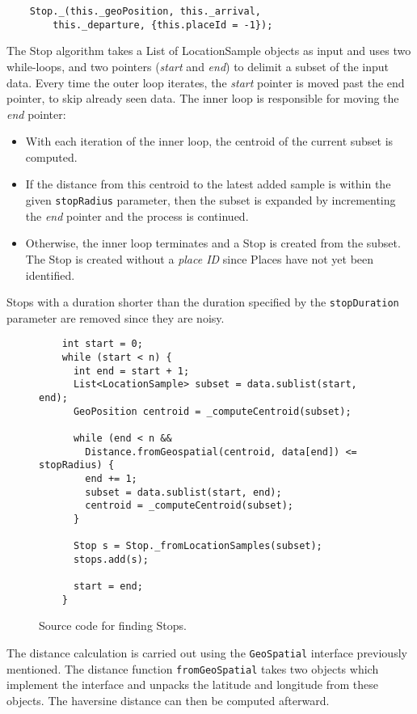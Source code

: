 \begin{verbatim}
    Stop._(this._geoPosition, this._arrival, 
        this._departure, {this.placeId = -1});
\end{verbatim}

The Stop algorithm takes a List of LocationSample objects as input and uses two while-loops, and two pointers (\textit{start} and \textit{end}) to delimit a subset of the input data. Every time the outer loop iterates, the \textit{start} pointer is moved past the end pointer, to skip already seen data. The inner loop is responsible for moving the \textit{end} pointer: \begin{itemize}
    \item With each iteration of the inner loop, the centroid of the current subset is computed.
    \item If the distance from this centroid to the latest added sample is within the given \verb|stopRadius| parameter, then the subset is expanded by incrementing the \textit{end} pointer and the process is continued.
    \item Otherwise, the inner loop terminates and a Stop is created from the subset. The Stop is created without a \textit{place ID} since Places have not yet been identified.
\end{itemize}

Stops with a duration shorter than the duration specified by the \verb|stopDuration| parameter are removed since they are noisy. 

\begin{figure}[h]
    \centering
    \begin{verbatim}
    int start = 0;
    while (start < n) {
      int end = start + 1;
      List<LocationSample> subset = data.sublist(start, end);
      GeoPosition centroid = _computeCentroid(subset);
        
      while (end < n && 
        Distance.fromGeospatial(centroid, data[end]) <= stopRadius) {
        end += 1;
        subset = data.sublist(start, end);
        centroid = _computeCentroid(subset);
      }
    
      Stop s = Stop._fromLocationSamples(subset);
      stops.add(s);
    
      start = end;
    }
\end{verbatim}
    \caption{Source code for finding Stops.}
    \label{fig:source-code-stops}
\end{figure}

The distance calculation is carried out using the \verb|GeoSpatial| interface previously mentioned. The distance function \verb|fromGeoSpatial| takes two objects which implement the interface and unpacks the latitude and longitude from these objects. The haversine distance can then be computed afterward.


